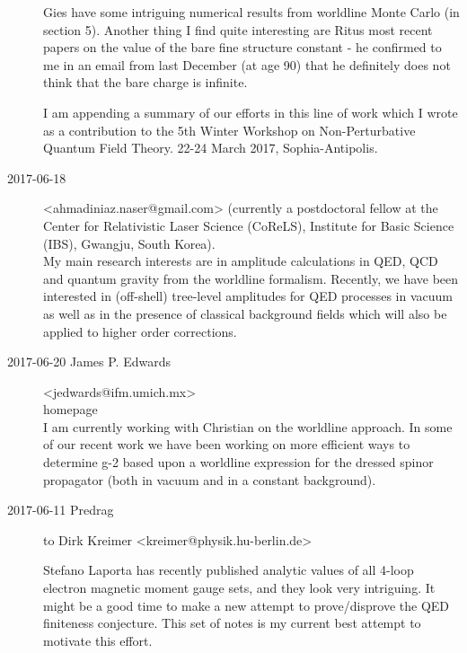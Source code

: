 \begin{description}
\begin{enumerate}
\end{enumerate}
Gies \etal{} have some intriguing numerical results from
worldline Monte Carlo (in section 5). Another thing I find quite
interesting are Ritus most recent
papers on the value of the bare fine
structure constant - he confirmed to me in an email from last December
(at age 90) that he definitely does not think that the bare charge is
infinite.

I am appending a summary of our efforts in this line of work
which I wrote as a contribution to the 5th Winter Workshop on
Non-Perturbative Quantum Field Theory. 22-24 March 2017,
Sophia-Antipolis.

\item[2017-06-18 ] <ahmadiniaz.naser@gmail.com>
(currently a postdoctoral fellow at the Center for Relativistic Laser
Science (CoReLS), Institute for Basic Science (IBS), Gwangju, South
Korea).
\\
My main research
interests are in amplitude calculations in QED, QCD and quantum gravity
from the worldline formalism. Recently, we have been interested in
(off-shell) tree-level amplitudes for QED processes in vacuum as well as
in the presence of classical background fields which will also be applied
to higher order corrections.

\item[2017-06-20 James P. Edwards] <jedwards@ifm.umich.mx>
\\
{homepage}
\\
I am currently working with Christian on the worldline approach. In some
of our recent work we have been working on more efficient ways to
determine g-2 based upon a worldline expression for the dressed spinor
propagator (both in vacuum and in a constant background).

\item[2017-06-11 Predrag] to
Dirk Kreimer <kreimer@physik.hu-berlin.de>
%
%

Stefano Laporta  has recently published analytic values of all 4-loop
electron magnetic moment gauge sets, and they look very intriguing.
It might be a good time to make a new attempt to prove/disprove
the QED finiteness conjecture. This set of notes is my current best attempt
to motivate this effort.


\end{description}

